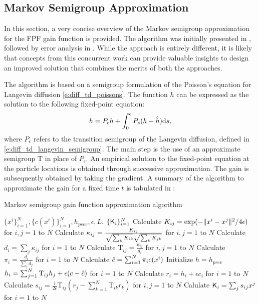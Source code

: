 \subsection{Markov Semigroup Approximation}
\label{s:coifman}
In this section, a very concise overview of the Markov semigroup approximation for the FPF gain function is provided. The algorithm was initially presented in \cite{tagmeh16}, followed by error analysis in \cite{tagmehmey17}. While the approach is entirely different, it is likely that concepts from this concurrent work can provide valuable insights to design an improved solution that combines the merits of both the approaches. 

The algorithm is based on a semigroup formulation of the Poisson's equation for Langevin diffusion \eqref{e:diff_td_poissons}. The function $h$ can be expressed as the solution to the following fixed-point equation:
\begin{equation}
h = P_\epsilon h + \int_0^\epsilon P_s (h - {\hat h}) \text{d} s,
\end{equation}
where $P_\epsilon$ refers to the transition semigroup of the Langevin diffusion, defined in \eqref{e:diff_td_langevin_semigroup}. The main step is the use of an approximate semigroup $\text{T}$ in place of $P_\epsilon$.
An empirical solution to the fixed-point equation at the particle locations is obtained through successive approximation. The gain is subsequently obtained by taking the gradient.  A summary of the algorithm to approximate the gain for a fixed time $t$ is tabulated in :
\begin{algorithm}{Markov semigroup gain function approximation algorithm}
\begin{algorithmic}[1]
	\Require $\{x^i\}_{i=1}^N, \{c(x^i)\}_{i=1}^N, h_{prev}, \epsilon, L$.
	\Ensure $\{\text{\sf K}_i\}_{i=1}^N$
	\State Calculate $K_{ij} = \exp(-\|x^i - x^j\|^2/ 4\epsilon)$ for $i,j = 1$ to $N$  
	\State Calculate $\kappa_{ij} = \frac{K_{ij}}{\sqrt{\sum_k K_{ik}}\sqrt{\sum_k K_{jk}}}$ for $i,j =1$ to $N$
	\State Calculate $d_i = \sum_j \kappa_{ij}$ for $i=1$ to $N$
	\State Calculate $\text{T}_{ij} = \frac{\kappa_{ij}}{d_i}$ for $i,j = 1$ to $N$ 
	\State Calculate $\pi_i = \frac{d_i}{\sum_j d_j}$ for $i=1$ to $N$
	\State Calculate $ {\hat c} = \sum_{i = 1}^N \pi_i c(x^i)$
	\State Initialize $h =h_{prev}$
		 \State $h_i = \sum_{j=1}^N \text{T}_{ij} h_j + \epsilon (c - {\hat c})$ for $i=1$ to $N$ 
		\EndFor
	\State Calculate $r_i = h_i + \epsilon c_i$ for $i=1$ to $N$
	\State Calculate $s_{ij} = \frac{1}{2\epsilon} \text{T}_{ij} (r_j - \sum_{k=1}^N \text{T}_{ik} r_k)$ for $i,j=1$ to $N$ 
	\State Calulate $\text{\sf K}_i  = \sum_j s_{ij} x^j$ for $i =1$ to $N$ 
	\label{alg:coifman}
\end{algorithmic}
\end{algorithm}

